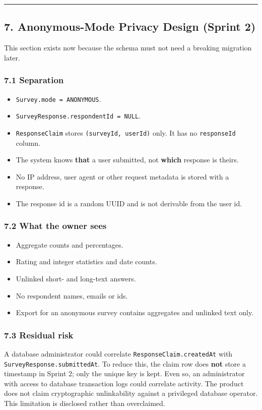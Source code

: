 \documentclass[12pt,a4paper]{article}
\begin{document}
\medskip\noindent\rule{\linewidth}{0.4pt}\medskip

\subsection*{7. Anonymous-Mode Privacy Design (Sprint 2)}
This section exists now because the schema must not need a breaking migration later.

\subsubsection*{7.1 Separation}
\begin{itemize}[leftmargin=*]
\item \texttt{Survey.mode = ANONYMOUS}.
\item \texttt{SurveyResponse.respondentId = NULL}.
\item \texttt{ResponseClaim} stores \texttt{(surveyId, userId)} only. It has no \texttt{responseId} column.
\item The system knows \textbf{that} a user submitted, not \textbf{which} response is theirs.
\item No IP address, user agent or other request metadata is stored with a response.
\item The response id is a random UUID and is not derivable from the user id.
\end{itemize}

\subsubsection*{7.2 What the owner sees}
\begin{itemize}[leftmargin=*]
\item Aggregate counts and percentages.
\item Rating and integer statistics and date counts.
\item Unlinked short- and long-text answers.
\item No respondent names, emails or ids.
\item Export for an anonymous survey contains aggregates and unlinked text only.
\end{itemize}

\subsubsection*{7.3 Residual risk}
A database administrator could correlate \texttt{ResponseClaim.createdAt} with \texttt{SurveyResponse.submittedAt}. To reduce this, the claim row does \textbf{not} store a timestamp in Sprint 2; only the unique key is kept. Even so, an administrator with access to database transaction logs could correlate activity. The product does not claim cryptographic unlinkability against a privileged database operator. This limitation is disclosed rather than overclaimed.
\end{document}
